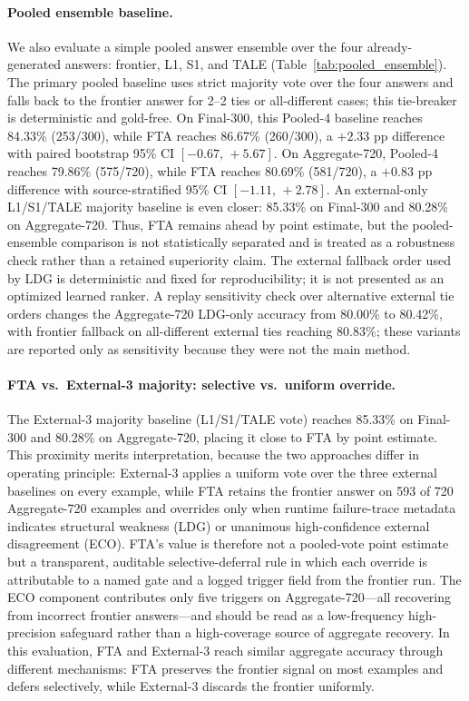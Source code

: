 \paragraph{Pooled ensemble baseline.}
We also evaluate a simple pooled answer ensemble over the four
already-generated answers: frontier, L1, S1, and TALE
(Table~\ref{tab:pooled_ensemble}).
The primary pooled baseline uses strict majority vote over the four answers
and falls back to the frontier answer for 2--2 ties or all-different cases;
this tie-breaker is deterministic and gold-free.
On Final-300, this Pooled-4 baseline reaches 84.33\% (253/300), while FTA
reaches 86.67\% (260/300), a $+2.33$ pp difference with paired bootstrap
95\% CI $[-0.67,\,+5.67]$.
On Aggregate-720, Pooled-4 reaches 79.86\% (575/720), while FTA reaches
80.69\% (581/720), a $+0.83$ pp difference with source-stratified 95\% CI
$[-1.11,\,+2.78]$.
An external-only L1/S1/TALE majority baseline is even closer: 85.33\% on
Final-300 and 80.28\% on Aggregate-720.
Thus, FTA remains ahead by point estimate, but the pooled-ensemble comparison
is not statistically separated and is treated as a robustness check rather
than a retained superiority claim.
The external fallback order used by LDG is deterministic and fixed for
reproducibility; it is not presented as an optimized learned ranker.
A replay sensitivity check over alternative external tie orders changes the
Aggregate-720 LDG-only accuracy from 80.00\% to 80.42\%, with frontier
fallback on all-different external ties reaching 80.83\%; these variants are
reported only as sensitivity because they were not the main method.

\paragraph{FTA vs.\ External-3 majority: selective vs.\ uniform override.}
The External-3 majority baseline (L1/S1/TALE vote) reaches 85.33\% on Final-300 and
80.28\% on Aggregate-720, placing it close to FTA by point estimate.
This proximity merits interpretation, because the two approaches differ in operating
principle: External-3 applies a uniform vote over the three external baselines on every
example, while FTA retains the frontier answer on 593 of 720 Aggregate-720 examples and
overrides only when runtime failure-trace metadata indicates structural weakness (LDG) or
unanimous high-confidence external disagreement (ECO).
FTA's value is therefore not a pooled-vote point estimate but a transparent, auditable
selective-deferral rule in which each override is attributable to a named gate and a logged
trigger field from the frontier run.
The ECO component contributes only five triggers on Aggregate-720---all recovering from
incorrect frontier answers---and should be read as a low-frequency high-precision
safeguard rather than a high-coverage source of aggregate recovery.
In this evaluation, FTA and External-3 reach similar aggregate accuracy through different
mechanisms: FTA preserves the frontier signal on most examples and defers selectively,
while External-3 discards the frontier uniformly.

